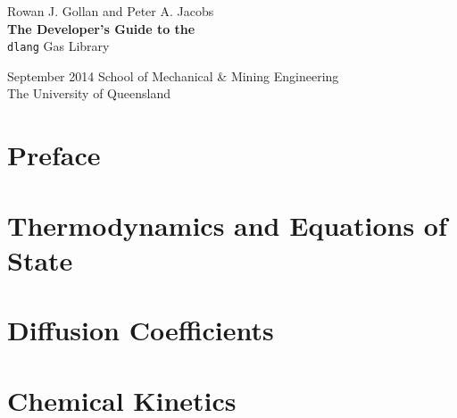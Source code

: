 \documentclass[a4paper,11pt,twoside,onecolumn]{memoir}
\begin{document}
\frontmatter

\begin{titlingpage}
\raggedleft
\vspace*{\baselineskip}
{\Large\sffamily Rowan J. Gollan and Peter A. Jacobs}\\[0.2\textheight]
{\bfseries\sffamily The Developer's Guide to the}\\[\baselineskip]
{\Huge\sffamily \texttt{dlang} Gas Library}\par
\vspace*{0.1\textheight}
{\Large\sffamily September 2014}
\vfill
\centering
{\large School of Mechanical \& Mining Engineering\\The University of Queensland}
\end{titlingpage}

\chapter{Preface}

\tableofcontents

\mainmatter



\chapter{Thermodynamics and Equations of State}

\chapter{Diffusion Coefficients}

\chapter{Chemical Kinetics}
\end{document}
